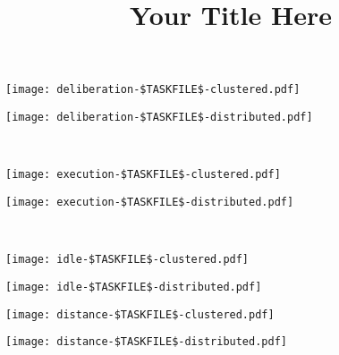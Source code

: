 \documentclass[11pt,a4paper]{article}
\title{Your Title Here}
\author{}
\date{}
\begin{document}
\maketitle

\noindent
\begin{minipage}{0.5\textwidth}
\texttt{[image: deliberation-\$TASKFILE\$-clustered.pdf]}
\end{minipage}
\begin{minipage}{0.5\textwidth}
\texttt{[image: deliberation-\$TASKFILE\$-distributed.pdf]}
\end{minipage}
\\[0.2cm]

\noindent
\begin{minipage}{0.5\textwidth}
\texttt{[image: execution-\$TASKFILE\$-clustered.pdf]}
\end{minipage}
\begin{minipage}{0.5\textwidth}
\texttt{[image: execution-\$TASKFILE\$-distributed.pdf]}
\end{minipage}
\\[0.2cm]

\noindent
\begin{minipage}{0.5\textwidth}
\texttt{[image: idle-\$TASKFILE\$-clustered.pdf]}
\end{minipage}
\begin{minipage}{0.5\textwidth}
\texttt{[image: idle-\$TASKFILE\$-distributed.pdf]}
\end{minipage}


\noindent
\begin{minipage}{0.5\textwidth}
\texttt{[image: distance-\$TASKFILE\$-clustered.pdf]}
\end{minipage}
\begin{minipage}{0.5\textwidth}
\texttt{[image: distance-\$TASKFILE\$-distributed.pdf]}
\end{minipage}
\\[0.5cm]
\end{document}
